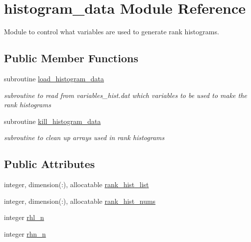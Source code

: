 \hypertarget{classhistogram__data}{\section{histogram\-\_\-data Module Reference}
\label{classhistogram__data}
}


Module to control what variables are used to generate rank histograms.  


\subsection*{Public Member Functions}
\begin{DoxyCompactItemize}
\item 
subroutine \hyperlink{classhistogram__data_a589a496c989be1af671e85ee0e4eadff}{load\-\_\-histogram\-\_\-data}
\begin{DoxyCompactList}\small\item\em subroutine to read from variables\-\_\-hist.\-dat which variables to be used to make the rank histograms \end{DoxyCompactList}\item 
subroutine \hyperlink{classhistogram__data_acc52068812749b7315e706a2539f101f}{kill\-\_\-histogram\-\_\-data}
\begin{DoxyCompactList}\small\item\em subroutine to clean up arrays used in rank histograms \end{DoxyCompactList}\end{DoxyCompactItemize}
\subsection*{Public Attributes}
\begin{DoxyCompactItemize}
\item 
integer, dimension(\-:), allocatable \hyperlink{classhistogram__data_a2f7cb336d665046859ebe5684ed09be8}{rank\-\_\-hist\-\_\-list}
\item 
integer, dimension(\-:), allocatable \hyperlink{classhistogram__data_a94a5c8fc25a86b8f62b2ff301de78d32}{rank\-\_\-hist\-\_\-nums}
\item 
integer \hyperlink{classhistogram__data_ac202796c6c4bfb9c3a16bd8c4b277eba}{rhl\-\_\-n}
\item 
integer \hyperlink{classhistogram__data_a8ac6a785fa075b9bf4d162e2833635d3}{rhn\-\_\-n}
\end{DoxyCompactItemize}


